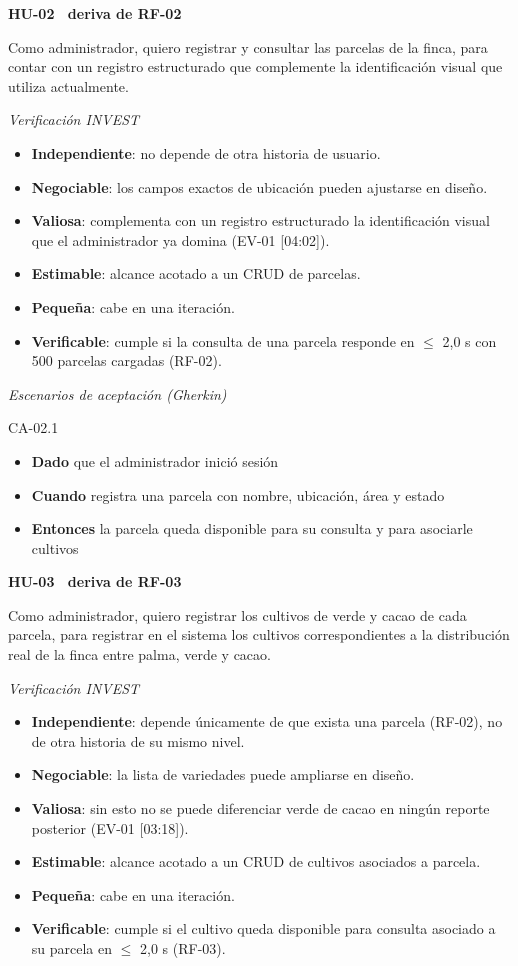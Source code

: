 \documentclass[12pt,a4paper]{article}
\begin{document}
\bigskip
\noindent\textbf{HU-02 \textperiodcentered\ deriva de RF-02}

\smallskip
\noindent Como administrador, quiero registrar y consultar las parcelas de la finca, para contar con un registro estructurado que complemente la identificación visual que utiliza actualmente.

\smallskip
\noindent\textit{Verificación INVEST}
\begin{itemize}
\item \textbf{Independiente}: no depende de otra historia de usuario.
\item \textbf{Negociable}: los campos exactos de ubicación pueden ajustarse en diseño.
\item \textbf{Valiosa}: complementa con un registro estructurado la identificación visual que el administrador ya domina (EV-01 [04:02]).
\item \textbf{Estimable}: alcance acotado a un CRUD de parcelas.
\item \textbf{Pequeña}: cabe en una iteración.
\item \textbf{Verificable}: cumple si la consulta de una parcela responde en $\leq$ 2,0 s con 500 parcelas cargadas (RF-02).
\end{itemize}

\smallskip
\noindent\textit{Escenarios de aceptación (Gherkin)}

\noindent CA-02.1
\begin{itemize}
\item[] \textbf{Dado} que el administrador inició sesión
\item[] \textbf{Cuando} registra una parcela con nombre, ubicación, área y estado
\item[] \textbf{Entonces} la parcela queda disponible para su consulta y para asociarle cultivos
\end{itemize}

\bigskip
\noindent\textbf{HU-03 \textperiodcentered\ deriva de RF-03}

\smallskip
\noindent Como administrador, quiero registrar los cultivos de verde y cacao de cada parcela, para registrar en el sistema los cultivos correspondientes a la distribución real de la finca entre palma, verde y cacao.

\smallskip
\noindent\textit{Verificación INVEST}
\begin{itemize}
\item \textbf{Independiente}: depende únicamente de que exista una parcela (RF-02), no de otra historia de su mismo nivel.
\item \textbf{Negociable}: la lista de variedades puede ampliarse en diseño.
\item \textbf{Valiosa}: sin esto no se puede diferenciar verde de cacao en ningún reporte posterior (EV-01 [03:18]).
\item \textbf{Estimable}: alcance acotado a un CRUD de cultivos asociados a parcela.
\item \textbf{Pequeña}: cabe en una iteración.
\item \textbf{Verificable}: cumple si el cultivo queda disponible para consulta asociado a su parcela en $\leq$ 2,0 s (RF-03).
\end{itemize}
\end{document}

